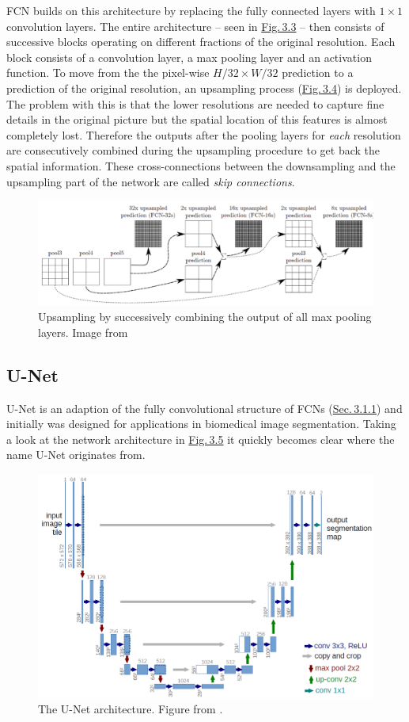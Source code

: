 FCN builds on this architecture by replacing the fully connected layers with $1\times1$ convolution layers. The entire architecture – seen in \hyperref[fig:3.3]{Fig.\,3.3} – then consists of successive blocks operating on different fractions of the original resolution. Each block consists of a convolution layer, a max pooling layer and an activation function. To move from the the pixel-wise $H/32\times W/32$ prediction to a prediction of the original resolution, an upsampling process (\hyperref[fig:3.4]{Fig.\,3.4}) is deployed. The problem with this is that the lower resolutions are needed to capture fine details in the original picture but the spatial location of this features is almost completely lost. Therefore the outputs after the pooling layers for \textit{each} resolution are consecutively combined during the upsampling procedure to get back the spatial information. These cross-connections between the downsampling and the upsampling part of the network are called \textit{skip connections}.

%
\begin{figure} \label{fig:3.4}
    \centering
    \includegraphics[width=.65\textwidth]{Chapters/figures/fcn2.PNG}
    \caption[FCN upsampling process]{Upsampling by successively combining the output of all max pooling layers. Image from \cite{fcn}}
\end{figure}
%
\subsection{U-Net} \label{sec:3.1.2}
U-Net \cite{unet} is an adaption of the fully convolutional structure of FCNs (\hyperref[sec:3.1.1]{Sec.\,3.1.1}) and initially was designed for applications in biomedical image segmentation. Taking a look at the network architecture in \hyperref[fig:3.5]{Fig.\,3.5} it quickly becomes clear where the name U-Net originates from.
%
\begin{figure}[h!] \label{fig:3.5}
    \centering
    \includegraphics[width=.70\textwidth]{Chapters/figures/unet.PNG}
    \caption[The U-Net architecture]{The U-Net architecture. Figure from \cite{unet}.}
\end{figure}
%

